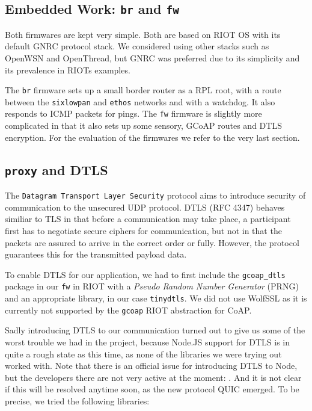 \documentclass[acmtog, language=english, nonacm]{acmart}
\begin{document}
    \subsection{Embedded Work: \texttt{br} and \texttt{fw}}

    Both firmwares are kept very simple. Both are based on RIOT OS with its default GNRC protocol stack. We considered using other stacks such as OpenWSN and OpenThread, but GNRC was preferred due to its simplicity and its prevalence in RIOTs examples.

    The \texttt{br} firmware sets up a small border router as a RPL root, with a route between the \texttt{sixlowpan} and \texttt{ethos} networks and with a watchdog. It also responds to ICMP packets for pings. The \texttt{fw} firmware is slightly more complicated in that it also sets up some sensory, GCoAP routes and DTLS encryption. For the evaluation of the firmwares we refer to the very last section.

    \label{subsec:proxy_and_dtls} \subsection{\texttt{proxy} and DTLS}

    The \texttt{Datagram Transport Layer Security} protocol aims to introduce security of communication to the unsecured UDP protocol. DTLS (RFC 4347) behaves similiar to TLS in that before a communication may take place, a participant first has to negotiate secure ciphers for communication, but not in that the packets are assured to arrive in the correct order or fully. However, the protocol guarantees this for the transmitted payload data.

    To enable DTLS for our application, we had to first include the \texttt{gcoap\_dtls} package in our \texttt{fw} in RIOT with a \emph{Pseudo Random Number Generator} (PRNG) and an appropriate library, in our case \texttt{tinydtls}. We did not use WolfSSL as it is currently not supported by the \texttt{gcoap} RIOT abstraction for CoAP.
    
    Sadly introducing DTLS to our communication turned out to give us some of the worst trouble we had in the project, because Node.JS support for DTLS is in quite a rough state as this time, as none of the libraries we were trying out worked with. Note that there is an official issue for introducing DTLS to Node, but the developers there are not very active at the moment: \cite{node-dtls-issue}. And it is not clear if this will be resolved anytime soon, as the new protocol QUIC emerged. To be precise, we tried the following libraries:
\end{document}
